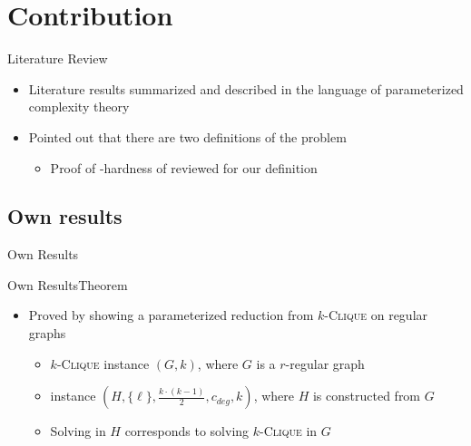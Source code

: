 \section{Contribution}

\begin{frame}{Literature Review}
    \begin{itemize}
        \item Literature results summarized and described in the language of parameterized complexity theory
        \item Pointed out that there are two definitions of the problem
        \begin{itemize}
            \item Proof of \NP-hardness of \HLdeg reviewed for our definition 
        \end{itemize}
    \end{itemize}
\end{frame}

\subsection
{Own results}

\begin{frame}{Own Results}
    
\end{frame}

\begin{frame}{Own Results}{Theorem}
    \begin{center}
    \end{center}
    \begin{center}
    \end{center}

    \begin{itemize}
        \item Proved by showing a parameterized reduction from $k$-\textsc{Clique} on regular graphs
        \begin{itemize}
            \item $k$-\textsc{Clique} instance $(G, k)$, where $G$ is a $r$-regular graph
            \item \HL instance $(H, \{\ell\}, \frac{k\cdot(k-1)}{2}, c_{deg}, k)$, where $H$ is constructed from $G$
            \item Solving \HL in $H$ corresponds to solving $k$-\textsc{Clique} in $G$
        \end{itemize}
    \end{itemize}
\end{frame}

